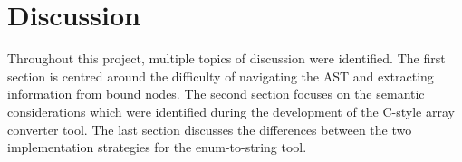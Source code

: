 
\chapter{Discussion}

Throughout this project, multiple topics of discussion were identified.
The first section is centred around the difficulty of navigating the AST and extracting information from bound nodes.
The second section focuses on the semantic considerations which were identified during the development of the C-style array converter tool.
The last section discusses the differences between the two implementation strategies for the enum-to-string tool.